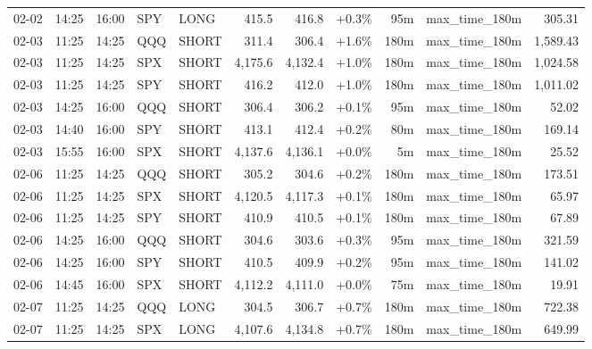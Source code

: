 \documentclass[11pt,a4paper,twoside]{article}
\begin{document}
\begin{center}
\begin{longtable}{>{\color{txtmain}}l l l l l r r r r >{\color{txtmain}}l r}
02-02 & 14:25 & 16:00 & SPY & LONG & 415.5 & 416.8 & \textcolor{wingreen}{+0.3\%} & 95m & max\_time\_180m & \textcolor{wingreen}{305.31} \\
02-03 & 11:25 & 14:25 & QQQ & SHORT & 311.4 & 306.4 & \textcolor{wingreen}{+1.6\%} & 180m & max\_time\_180m & \textcolor{wingreen}{1,589.43} \\
02-03 & 11:25 & 14:25 & SPX & SHORT & 4,175.6 & 4,132.4 & \textcolor{wingreen}{+1.0\%} & 180m & max\_time\_180m & \textcolor{wingreen}{1,024.58} \\
02-03 & 11:25 & 14:25 & SPY & SHORT & 416.2 & 412.0 & \textcolor{wingreen}{+1.0\%} & 180m & max\_time\_180m & \textcolor{wingreen}{1,011.02} \\
02-03 & 14:25 & 16:00 & QQQ & SHORT & 306.4 & 306.2 & \textcolor{wingreen}{+0.1\%} & 95m & max\_time\_180m & \textcolor{wingreen}{52.02} \\
02-03 & 14:40 & 16:00 & SPY & SHORT & 413.1 & 412.4 & \textcolor{wingreen}{+0.2\%} & 80m & max\_time\_180m & \textcolor{wingreen}{169.14} \\
02-03 & 15:55 & 16:00 & SPX & SHORT & 4,137.6 & 4,136.1 & \textcolor{wingreen}{+0.0\%} & 5m & max\_time\_180m & \textcolor{wingreen}{25.52} \\
02-06 & 11:25 & 14:25 & QQQ & SHORT & 305.2 & 304.6 & \textcolor{wingreen}{+0.2\%} & 180m & max\_time\_180m & \textcolor{wingreen}{173.51} \\
02-06 & 11:25 & 14:25 & SPX & SHORT & 4,120.5 & 4,117.3 & \textcolor{wingreen}{+0.1\%} & 180m & max\_time\_180m & \textcolor{wingreen}{65.97} \\
02-06 & 11:25 & 14:25 & SPY & SHORT & 410.9 & 410.5 & \textcolor{wingreen}{+0.1\%} & 180m & max\_time\_180m & \textcolor{wingreen}{67.89} \\
02-06 & 14:25 & 16:00 & QQQ & SHORT & 304.6 & 303.6 & \textcolor{wingreen}{+0.3\%} & 95m & max\_time\_180m & \textcolor{wingreen}{321.59} \\
02-06 & 14:25 & 16:00 & SPY & SHORT & 410.5 & 409.9 & \textcolor{wingreen}{+0.2\%} & 95m & max\_time\_180m & \textcolor{wingreen}{141.02} \\
02-06 & 14:45 & 16:00 & SPX & SHORT & 4,112.2 & 4,111.0 & \textcolor{wingreen}{+0.0\%} & 75m & max\_time\_180m & \textcolor{wingreen}{19.91} \\
02-07 & 11:25 & 14:25 & QQQ & LONG & 304.5 & 306.7 & \textcolor{wingreen}{+0.7\%} & 180m & max\_time\_180m & \textcolor{wingreen}{722.38} \\
02-07 & 11:25 & 14:25 & SPX & LONG & 4,107.6 & 4,134.8 & \textcolor{wingreen}{+0.7\%} & 180m & max\_time\_180m & \textcolor{wingreen}{649.99} \\

\end{longtable}
\end{center}
\end{document}

